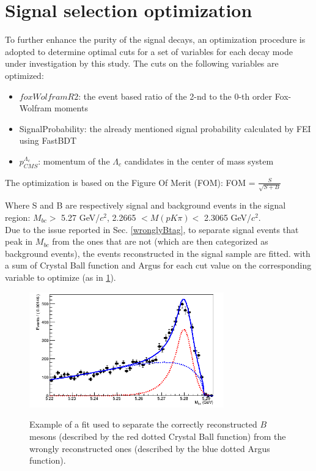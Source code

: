 \newpage

\section{Signal selection optimization}

To further enhance the purity of the signal decays, an optimization procedure is adopted to determine optimal cuts for a set of variables for each decay mode under investigation by this study.
The cuts on the following variables are optimized:
\begin{itemize}
    \item $foxWolframR2$: the event based ratio
of the 2-nd to the 0-th order Fox-Wolfram moments
    \item SignalProbability: the already mentioned signal probability calculated by FEI using FastBDT
    \item $p^{\Lambda_c}_{CMS}$: momentum of the $\Lambda_c$ candidates in the center of mass system
\end{itemize}

The optimization is based on the Figure Of Merit (FOM): FOM = $\frac{S}{\sqrt{S+B}}$

Where S and B are respectively signal and background events in the signal region: $M_{bc} > $ 5.27 GeV/$c^2$,  2.2665  $< M(p K \pi) <$ 2.3065 GeV/$c^2$.\\
Due to the issue reported in Sec. \ref{wronglyBtag}, to separate signal events that peak in $M_{bc}$ from the ones that are not (which are then categorized as background events), the events reconstructed in the signal sample are fitted. with a sum of Crystal Ball function and Argus for each cut value on the corresponding variable to optimize (as in \cref{fig:wrongB_Mbc}).

\begin{figure}[h!]
{\includegraphics[width=0.75\textwidth]{03-Selection/figs/wrongB_Mbc.png}}
\caption{Example of a fit used to separate the correctly reconstructed $B$ mesons (described by the red dotted Crystal Ball function) from the wrongly reconstructed ones (described by the blue dotted Argus function).}
\label{fig:wrongB_Mbc}
\end{figure}

